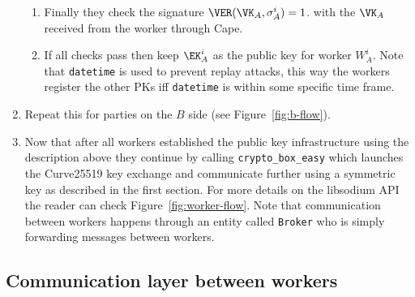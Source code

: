 \begin{enumerate}
\begin{enumerate}
    \item Finally they check the signature $\VER(\VK_A, \sigma^i_A) = 1$.
    with the $\VK_A$ received from the worker through Cape.
    \item If all checks pass then keep $\EK_A^i$ as the public key for worker $W_A^i$.
    Note that \verb|datetime| is used to prevent replay attacks, this way the workers
    register the other PKs iff \verb|datetime| is within some specific time frame.
  \end{enumerate}

  \item Repeat this for parties on the $B$ side (see Figure~\ref{fig:b-flow}).

  \item Now that after all workers established the public key infrastructure
  using the description above they continue by calling \verb|crypto_box_easy|
  which launches the Curve25519 key exchange and communicate further using a
  symmetric key as described in the first section. For more details on the libsodium API
  the reader can check Figure~\ref{fig:worker-flow}. Note that communication
  between workers happens through an entity called \verb|Broker| who is
  simply forwarding messages between workers.

\end{enumerate}

\subsection{Communication layer between workers}



